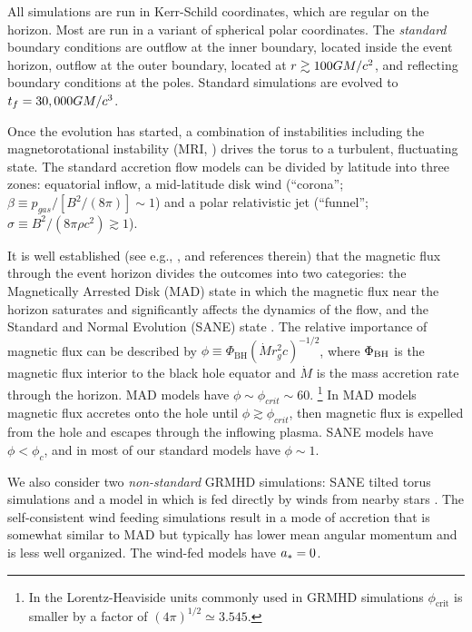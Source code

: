 All simulations are run in Kerr-Schild coordinates, which are regular on the horizon.  Most are run in a variant of spherical polar coordinates.  The {\em standard} boundary conditions are outflow at the inner boundary, located inside the event horizon, outflow at the outer boundary, located at $r \gtrsim 100 GM/c^2$, and reflecting boundary conditions at the poles.  Standard  simulations are evolved to $t_f=30,000 GM/c^3$.

Once the evolution has started, a combination of instabilities including the magnetorotational instability (MRI, \citealt{1992ApJ...400..610B}) drives the torus to a turbulent, fluctuating state. The standard accretion flow models can be divided by  latitude into three zones: equatorial inflow, a mid-latitude disk wind (``corona''; $\beta \equiv p_{gas}/[B^2/(8\pi)] \sim 1$) and a polar relativistic jet (``funnel''; $\sigma \equiv B^2/(8\pi \rho c^2) \gtrsim 1$).

It is well established (see e.g., ,  and references therein) that the magnetic flux through the event horizon divides the outcomes into two categories: the Magnetically Arrested Disk (MAD) state \citep[e.g.,][]{1974Ap&SS..28...45B, Igumenschchev:2003, 2003PASJ...55L..69N} in which the magnetic flux near the horizon saturates and significantly affects the dynamics of the flow, and the Standard and Normal Evolution (SANE) state \citep[e.g.,][]{2003ApJ...589..444G, devilliers:2003, Narayan:2012}.  The relative importance of magnetic flux can be described by $\phi \equiv \Phi_{\mathrm{BH}} (\dot{M} r_g^2 c)^{-1/2}$, where $\Phi_{\rm BH}$ is the magnetic flux interior to the black hole equator and $\dot{M}$ is the mass accretion rate through the horizon. MAD models have $\phi \sim \phi_{crit} \sim 60$. \footnote{In the Lorentz-Heaviside units commonly used in GRMHD simulations $\phi_\mathrm{crit}$ is smaller by a factor of $(4\pi)^{1/2} \simeq 3.545$.}  In MAD models magnetic flux accretes onto the hole until $\phi \gtrsim \phi_{crit}$, then magnetic flux is expelled from the hole and escapes through the inflowing plasma.  SANE models have $\phi < \phi_c$, and in most of our standard models have $\phi \sim 1$.

We also consider two {\it non-standard} GRMHD simulations: SANE tilted torus simulations \citep{ref} and a model in which \sgra is fed directly by winds from nearby stars \sgra \citep{2020ApJ...896L...6R}. The self-consistent wind feeding simulations result in a mode of accretion that is somewhat similar to MAD but typically has lower mean angular momentum and is less well organized.
The wind-fed models have $a_* = 0$.

